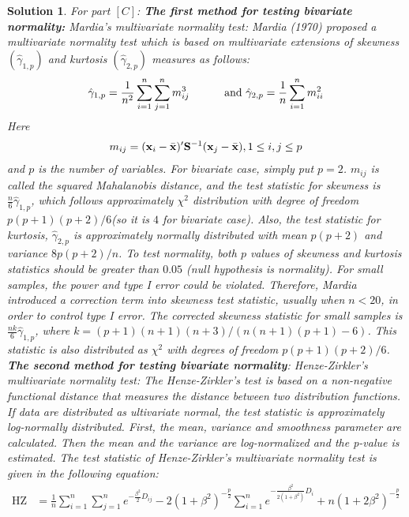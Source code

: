 \documentclass[11pt]{article}
\newtheorem{sol}{Solution}
\begin{document}
\begin{sol}
	For part $[C]$:\vskip 2mm
	{\bf The first method for testing bivariate normality:}\vskip 2mm
	Mardia's multivariate normality test:\vskip 2mm
	Mardia (1970) proposed a multivariate normality test which is based on multivariate extensions of skewness $(\hat{\gamma}_{1, p})$ and kurtosis $(\hat{\gamma}_{2, p})$ measures as follows:
	\begin{align*}
		\hat{\gamma}_{1, p} = \frac{1}{n^2}\sum_{i = 1}^{n}\sum_{j = 1}^nm_{ij}^3 \hskip 1cm \text{ and } \hat{\gamma}_{2, p} = \frac{1}{n}\sum_{i = 1}^{n}m_{ii}^2
	\end{align*}
	Here
	\begin{align*}
		m_{ij} = ({\bf x}_i - \bar{{\bf x}})'{\bf S}^{-1}({\bf x}_j - \bar{{\bf x}}), 1 \leq i, j \leq p
	\end{align*}
	and $p$ is the number of variables. For bivariate case, simply put $p = 2$.\vskip 2mm
	$m_{ij}$ is called the squared Mahalanobis distance, and the test statistic for skewness is $\frac{n}{6}\hat{\gamma}_{1, p}$, which follows approximately $\chi^2$ distribution with degree of freedom $p(p+1)(p+2)/6$(so it is $4$ for bivariate case). Also, the test statistic for kurtosis, $\hat{\gamma}_{2, p}$ is approximately normally distributed with mean $p(p + 2)$ and variance $8p(p + 2)/n$.\vskip 2mm
	To test normality, both $p$ values of skewness and kurtosis statistics should be greater than $0.05$ (null hypothesis is normality).\vskip 2mm
	For small samples, the power and type I error could be violated. Therefore, Mardia introduced a correction term into skewness test statistic, usually when $n < 20$, in order to control type I error. The corrected skewness statistic for small samples is $\frac{nk}{6}\hat{\gamma}_{1, p}$, where $k = (p+1)(n+1)(n+3)/(n(n+1)(p+1)-6)$. This statistic is also distributed as $\chi^2$ with degrees of freedom $p(p+1)(p+2)/6$.\vskip 2mm
	{\bf The second method for testing bivariate normality}:\vskip 2mm
	Henze-Zirkler's multivariate normality test:\vskip 2mm
	The Henze-Zirkler's test is based on a non-negative functional distance that measures the distance between two distribution functions. If data are distributed as ultivariate normal, the test statistic is approximately log-normally distributed. First, the mean, variance and smoothness parameter are calculated. Then the mean and the variance are log-normalized and the p-value is estimated. The test statistic of Henze-Zirkler's multivariate normality test is given in the following equation:
	\begin{align*}
		\text{HZ} &= \frac{1}{n}\sum_{i = 1}^{n}\sum_{j = 1}^{n}e^{-\frac{\beta^2}{2}D_{ij}} - 2 (1 + \beta^2)^{-\frac{p}{2}}\sum_{i = 1}^{n}e^{-\frac{\beta^2}{2(1 + \beta^2)}D_i} + n(1 + 2\beta^2)^{-\frac{p}{2}}

\end{align*}
\end{sol}
\end{document}
